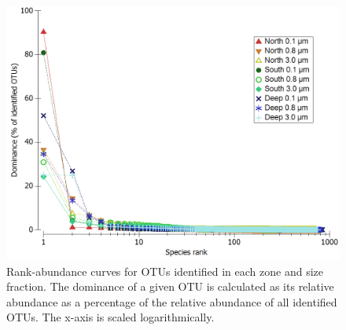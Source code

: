 \begin{figure}
  \centering
  \includegraphics[width=\textwidth]{../polarfront/rankabundance.png}
  \caption[Rank-abundance curves for OTUs in each zone and size fraction]{Rank-abundance curves for OTUs identified in each zone and size fraction. The dominance of a given OTU is calculated as its relative abundance as a percentage of the relative abundance of all identified OTUs. The x-axis is scaled logarithmically.}
  \label{fig:rankabundance}
\end{figure}
